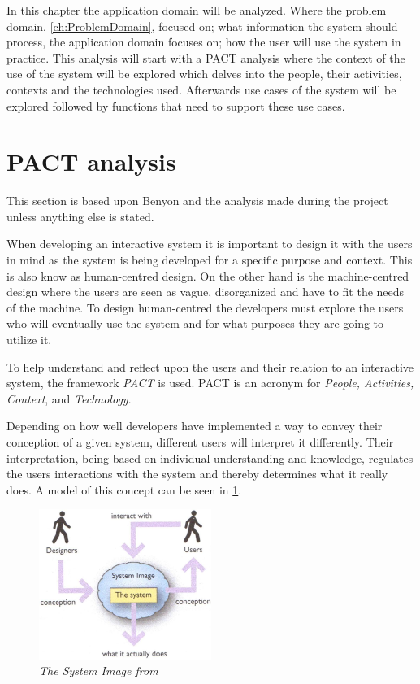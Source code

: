 
In this chapter the application domain will be analyzed.
Where the problem domain, \cref{ch:ProblemDomain}, focused on; what information the system should process, the application domain focuses on; how the user will use the system in practice.
This analysis will start with a PACT analysis where the context of the use of the system will be explored which delves into the people, their activities, contexts and the technologies used.
Afterwards use cases of the system will be explored followed by functions that need to support these use cases.

\section{PACT analysis}\label{sec:PACT}
This section is based upon Benyon \cite{Benyon} and the analysis made during the project unless anything else is stated.

When developing an interactive system it is important to design it with the users in mind as the system is being developed for a specific purpose and context.
This is also know as human-centred design.
On the other hand is the machine-centred design where the users are seen as vague, disorganized and have to fit the needs of the machine.
To design human-centred the developers must explore the users who will eventually use the system and for what purposes they are going to utilize it.

To help understand and reflect upon the users and their relation to an interactive system, the framework \textit{PACT} is used.
PACT is an acronym for \textit{People, Activities, Context}, and \textit{Technology}.

Depending on how well developers have implemented a way to convey their conception of a given system, different users will interpret it differently.
Their interpretation, being based on individual understanding and knowledge, regulates the users interactions with the system and thereby determines what it really does.
A model of this concept can be seen in \cref{fig:PACT-SystemImage}.

\begin{figure}[H]
	\centering
	\includegraphics[width=0.5\textwidth]{billeder/SystemImage-Benyon.jpg}
	\caption{\textit{The System Image from \citep[p.~31]{Benyon}}}
	\label{fig:PACT-SystemImage}
\end{figure}


